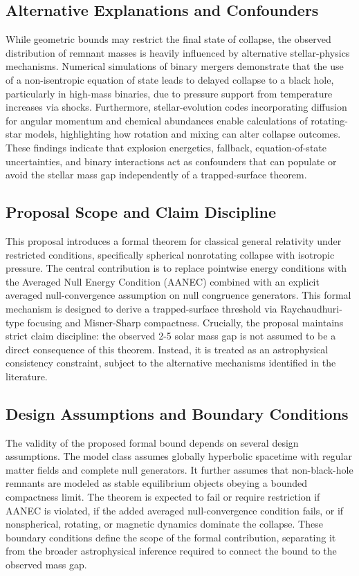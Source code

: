 \documentclass[conference]{IEEEtran}
\begin{document}
\subsection{Alternative Explanations and Confounders}
While geometric bounds may restrict the final state of collapse, the observed distribution of remnant masses is heavily influenced by alternative stellar-physics mechanisms. Numerical simulations of binary mergers demonstrate that the use of a non-isentropic equation of state leads to delayed collapse to a black hole, particularly in high-mass binaries, due to pressure support from temperature increases via shocks. Furthermore, stellar-evolution codes incorporating diffusion for angular momentum and chemical abundances enable calculations of rotating-star models, highlighting how rotation and mixing can alter collapse outcomes. These findings indicate that explosion energetics, fallback, equation-of-state uncertainties, and binary interactions act as confounders that can populate or avoid the stellar mass gap independently of a trapped-surface theorem.~\cite{cite_7a44e6730c44cb39,cite_bfae3a92efd1d48f}

\subsection{Proposal Scope and Claim Discipline}
This proposal introduces a formal theorem for classical general relativity under restricted conditions, specifically spherical nonrotating collapse with isotropic pressure. The central contribution is to replace pointwise energy conditions with the Averaged Null Energy Condition (AANEC) combined with an explicit averaged null-convergence assumption on null congruence generators. This formal mechanism is designed to derive a trapped-surface threshold via Raychaudhuri-type focusing and Misner-Sharp compactness. Crucially, the proposal maintains strict claim discipline: the observed 2-5 solar mass gap is not assumed to be a direct consequence of this theorem. Instead, it is treated as an astrophysical consistency constraint, subject to the alternative mechanisms identified in the literature.

\subsection{Design Assumptions and Boundary Conditions}
The validity of the proposed formal bound depends on several design assumptions. The model class assumes globally hyperbolic spacetime with regular matter fields and complete null generators. It further assumes that non-black-hole remnants are modeled as stable equilibrium objects obeying a bounded compactness limit. The theorem is expected to fail or require restriction if AANEC is violated, if the added averaged null-convergence condition fails, or if nonspherical, rotating, or magnetic dynamics dominate the collapse. These boundary conditions define the scope of the formal contribution, separating it from the broader astrophysical inference required to connect the bound to the observed mass gap.
\end{document}
